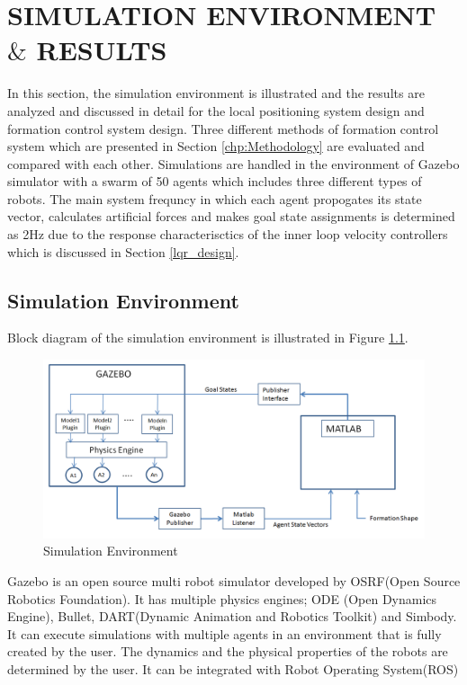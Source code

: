 

\chapter{SIMULATION ENVIRONMENT $\&$ RESULTS}
\label{chp:simulation}











In this section, the simulation environment is illustrated and the results are analyzed and discussed in detail for the local positioning system design and formation control system design. Three different methods of formation control system which are presented in Section \ref{chp:Methodology} are evaluated and compared with each other. Simulations are handled in the environment of Gazebo simulator with a swarm of 50 agents which includes three different types of robots. The main system frequncy in which each agent propogates its state vector, calculates artificial forces and makes goal state assignments is determined as 2Hz due to the response characterisctics of the inner loop velocity controllers which is discussed in Section \ref{lqr_design}. 

\section{Simulation Environment}
Block diagram of the simulation environment is illustrated in Figure \ref{simulation_env_ref}.

\begin{figure}[H]
\caption{Simulation Environment} \label{simulation_env_ref}
\centering
\includegraphics[scale = 0.45]{environment}
\end{figure}
    
Gazebo is an open source multi robot simulator developed by OSRF(Open Source Robotics Foundation). It has multiple physics engines; ODE (Open Dynamics Engine), Bullet, DART(Dynamic Animation and Robotics Toolkit) and Simbody. It can execute simulations with multiple agents in an environment that is fully created by the user. The dynamics and the physical properties of the robots are determined by the user. It can be integrated with Robot Operating System(ROS)

